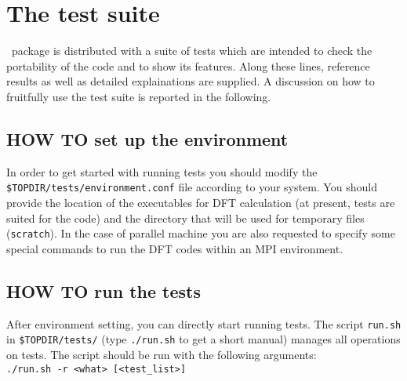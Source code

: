 
\thispagestyle{empty}
\section{The test suite}
\label{section:test}
%
\WANT\ package is distributed with a suite of tests which are intended
to check the portability of the code and to show its features.
Along these lines, reference results as well as detailed explainations 
are supplied.  A discussion on how to fruitfully use the test suite is reported
in the following. 

\subsection*{HOW TO set up the environment}
     In order to get started with running tests you should modify the
     {\tt \$TOPDIR/tests/environment.conf} file according to your system.
     You should provide the location of the executables for DFT calculation
     (at present, tests are suited for the \PWSCF code) and the directory 
     that will be used for temporary files ({\tt scratch}). 
     In the case of parallel machine you are also requested to 
     specify some special commands to run the DFT codes within an 
     MPI environment.

\subsection*{HOW TO run the tests}
     After environment setting, you can directly start running tests. The
     script {\tt run.sh} in {\tt \$TOPDIR/tests/} (type {\tt ./run.sh} to get a 
     short manual) manages all operations on tests. 
     The script should be run with the following arguments: \\

     {\tt  ./run.sh -r <what>  [<test\_list>] } \\

